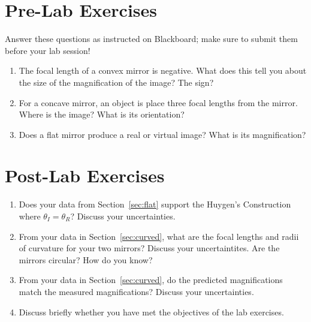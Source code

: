 \documentclass[12pt]{article}
\begin{document}
\newpage
 
\section*{Pre-Lab Exercises}

Answer these questions as instructed on Blackboard; make sure to
submit them before your lab session!

\begin{enumerate}
\item The focal length of a convex mirror is negative.  What does this
  tell you about the size of the magnification of the image?  The
  sign?
\item For a concave mirror, an object is place three focal lengths
  from the mirror.  Where is the image?  What is its orientation?
\item Does a flat mirror produce a real or virtual image?  What is its
  magnification? 
\end{enumerate}

\newpage

\section*{Post-Lab Exercises}

\begin{enumerate}
\item Does your data from Section~\ref{sec:flat} support the Huygen's
  Construction where $\theta_I = \theta_R$?  Discuss your
  uncertainties.
\item From your data in Section~\ref{sec:curved}, what are the focal
  lengths and radii of curvature for your two mirrors?  Discuss your
  uncertaintites.  Are the mirrors circular?  How do you know?
\item From your data in Section~\ref{sec:curved}, do the predicted
  magnifications match the measured magnifications?  Discuss your
  uncertainties. 
\item Discuss briefly whether you have met the objectives of the lab
  exercises.
\end{enumerate}
\end{document}
